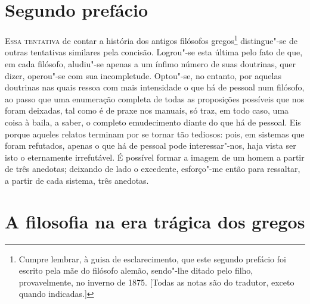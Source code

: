 \chapter[Segundo prefácio]{Segundo prefácio}


\textsc{Essa tentativa} de contar a história dos antigos filósofos gregos\footnote{ Cumpre lembrar, à guisa de
esclarecimento, que este segundo prefácio foi escrito pela mãe do
filósofo alemão, sendo"-lhe ditado pelo filho, provavelmente, no inverno
de 1875. [Todas as notas são do tradutor, exceto quando indicadas.]}
distingue"-se de outras tentativas similares pela concisão. Logrou"-se
esta última pelo fato de que, em cada filósofo, aludiu"-se apenas a um
ínfimo número de suas doutrinas, quer dizer, operou"-se com sua incompletude.
Optou"-se, no entanto, por aquelas doutrinas nas quais
ressoa com mais intensidade o que há de pessoal num filósofo, ao passo
que uma enumeração completa de todas as proposições possíveis que nos
foram deixadas, tal como é de praxe nos manuais, só traz, em todo caso,
uma coisa à baila, a saber, o completo emudecimento diante do que há de
pessoal. Eis porque aqueles relatos terminam por se tornar tão
tediosos: pois, em sistemas que foram refutados, apenas o que há de
pessoal pode interessar"-nos, haja vista ser isto o eternamente
irrefutável. É possível formar a imagem de um homem a partir de três
anedotas; deixando de lado o excedente, esforço"-me então para
ressaltar, a partir de cada sistema, três anedotas.

\chapter{A filosofia na era trágica dos gregos}

\sectionitem

